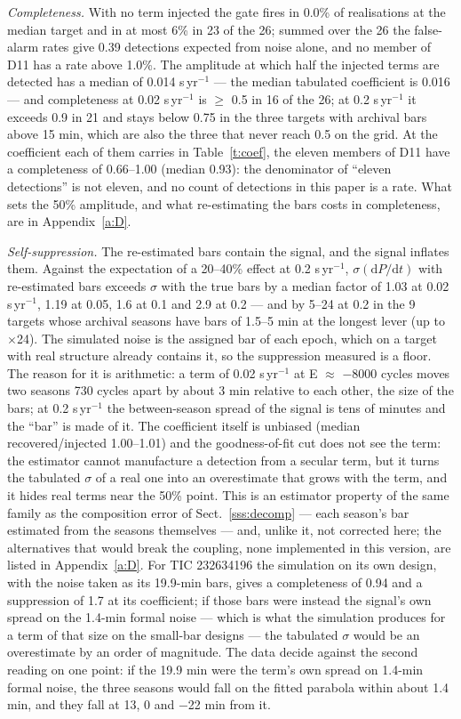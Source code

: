 \documentclass{aa}
\begin{document}
\textit{Completeness.} With no term injected the gate fires in 0.0\% of realisations at the median target and in at most 6\% in 23 of the 26; summed over the 26 the false-alarm rates give 0.39 detections expected from noise alone, and no member of D11 has a rate above 1.0\%. The amplitude at which half the injected terms are detected has a median of 0.014 s\,yr$^{-1}$ --- the median tabulated coefficient is 0.016 --- and completeness at 0.02 s\,yr$^{-1}$ is $\ge$ 0.5 in 16 of the 26; at 0.2 s\,yr$^{-1}$ it exceeds 0.9 in 21 and stays below 0.75 in the three targets with archival bars above 15 min, which are also the three that never reach 0.5 on the grid. At the coefficient each of them carries in Table~\ref{t:coef}, the eleven members of D11 have a completeness of 0.66--1.00 (median 0.93): the denominator of ``eleven detections'' is not eleven, and no count of detections in this paper is a rate. What sets the 50\% amplitude, and what re-estimating the bars costs in completeness, are in Appendix~\ref{a:D}.

\textit{Self-suppression.} The re-estimated bars contain the signal, and the signal inflates them. Against the expectation of a 20--40\% effect at 0.2 s\,yr$^{-1}$, $\sigma(\mathrm{d}P/\mathrm{d}t)$ with re-estimated bars exceeds $\sigma$ with the true bars by a median factor of 1.03 at 0.02 s\,yr$^{-1}$, 1.19 at 0.05, 1.6 at 0.1 and 2.9 at 0.2 --- and by 5--24 at 0.2 in the 9 targets whose archival seasons have bars of 1.5--5 min at the longest lever (up to $\times$24). The simulated noise is the assigned bar of each epoch, which on a target with real structure already contains it, so the suppression measured is a floor. The reason for it is arithmetic: a term of 0.02 s\,yr$^{-1}$ at E $\approx$ $-$8000 cycles moves two seasons 730 cycles apart by about 3 min relative to each other, the size of the bars; at 0.2 s\,yr$^{-1}$ the between-season spread of the signal is tens of minutes and the ``bar'' is made of it. The coefficient itself is unbiased (median recovered/injected 1.00--1.01) and the goodness-of-fit cut does not see the term: the estimator cannot manufacture a detection from a secular term, but it turns the tabulated $\sigma$ of a real one into an overestimate that grows with the term, and it hides real terms near the 50\% point. This is an estimator property of the same family as the composition error of Sect.~\ref{sss:decomp} --- each season's bar estimated from the seasons themselves --- and, unlike it, not corrected here; the alternatives that would break the coupling, none implemented in this version, are listed in Appendix~\ref{a:D}. For TIC 232634196 the simulation on its own design, with the noise taken as its 19.9-min bars, gives a completeness of 0.94 and a suppression of 1.7 at its coefficient; if those bars were instead the signal's own spread on the 1.4-min formal noise --- which is what the simulation produces for a term of that size on the small-bar designs --- the tabulated $\sigma$ would be an overestimate by an order of magnitude. The data decide against the second reading on one point: if the 19.9 min were the term's own spread on 1.4-min formal noise, the three seasons would fall on the fitted parabola within about 1.4 min, and they fall at 13, 0 and $-$22 min from it.
\end{document}
